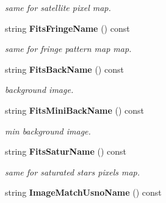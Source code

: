 \begin{CompactItemize}
\begin{CompactList}\small\item\em same for satellite pixel map.\item\end{CompactList}\item 
{}
string {\bf Fits\-Fringe\-Name} () const\label{class_dbimage_a19}

\begin{CompactList}\small\item\em same for fringe pattern map map.\item\end{CompactList}\item 
{}
string {\bf Fits\-Back\-Name} () const\label{class_dbimage_a20}

\begin{CompactList}\small\item\em background image.\item\end{CompactList}\item 
{}
string {\bf Fits\-Mini\-Back\-Name} () const\label{class_dbimage_a21}

\begin{CompactList}\small\item\em min background image.\item\end{CompactList}\item 
{}
string {\bf Fits\-Satur\-Name} () const\label{class_dbimage_a22}

\begin{CompactList}\small\item\em same for saturated stars pixels map.\item\end{CompactList}\item 
{}
string {\bf Image\-Match\-Usno\-Name} () const\label{class_dbimage_a23}


\end{CompactItemize}
